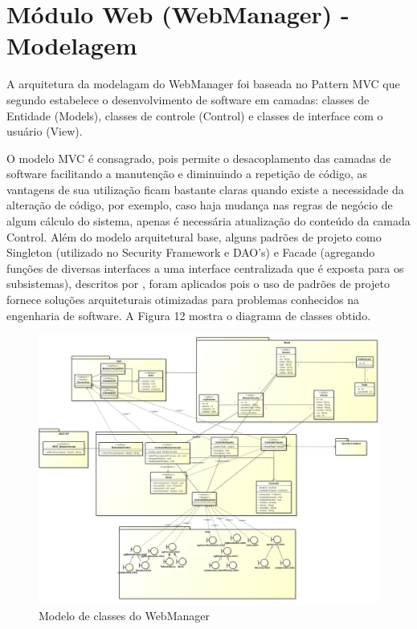 \section{Módulo Web (WebManager) - Modelagem}

A arquitetura da modelagam do WebManager foi baseada no Pattern MVC que segundo \textcite{Mendes:2002} estabelece o desenvolvimento de software em camadas: classes de Entidade (Models), classes de controle (Control) e classes de interface com o usuário (View). 

O modelo MVC é consagrado, pois permite o desacoplamento das camadas de software facilitando a manutenção e diminuindo a repetição de código, as vantagens de sua utilização ficam bastante claras quando existe a necessidade da alteração de código, por exemplo, caso haja mudança nas regras de negócio de algum cálculo do sistema, apenas é necessária atualização do conteúdo da camada Control. Além do modelo arquitetural base, alguns padrões de projeto como Singleton (utilizado no Security Framework e DAO's) e Facade (agregando funções de diversas interfaces a uma interface centralizada que é exposta para os subsistemas), descritos por \textcite{Gamma:2000}, foram aplicados pois o uso de padrões de projeto fornece soluções arquiteturais otimizadas para problemas conhecidos na engenharia de software. A Figura 12 mostra o diagrama de classes obtido.

\begin{landscape}

\begin{figure}[!htb]
	\centering
	\includegraphics[width=20.00cm\textwidth]{figures/6_web_manager.png}
	\caption{Modelo de classes do WebManager}
	\label{Figura 12}
\end{figure}
\end{landscape}

